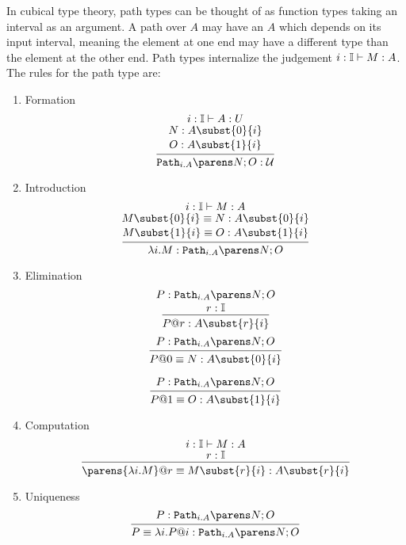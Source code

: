 \documentclass[11pt]{article}
\begin{document}
In cubical type theory, path types can be thought of as function types taking an interval as an argument. A path over $A$ may have an $A$ which depends on its input interval, meaning the element at one end may have a different type than the element at the other end. Path types internalize the judgement $\oftype{\oftype{i}{\bI}}{M}{A}$. The rules for the path type are:
\begin{enumerate}
    \item Formation
\[
    \begin{prooftree}
        \hypo{\oftype{\oftype{i}{\bI}}{A}{U}}
        \infer[no rule]1{\oftype{N}{A\subst{0}{i}}}
        \infer[no rule]1{\oftype{O}{A\subst{1}{i}}}
        \infer1{\oftype{\pathtypes{i.A}{N}{O}}{\UU}}
    \end{prooftree}
\]
    \item Introduction
\[
    \begin{prooftree}
        \hypo{\oftype{\oftype{i}{\bI}}{M}{A}}
        \infer[no rule]1{\oftype{\eqtype{M\subst{0}{i}}{N}}{A\subst{0}{i}}}
        \infer[no rule]1{\oftype{\eqtype{M\subst{1}{i}}{O}}{A\subst{1}{i}}}
        \infer1{\oftype{\lam{i}{M}}{\pathtypes{i.A}{N}{O}}}
    \end{prooftree}
\]
    \item Elimination
\[
    \begin{prooftree}
        \hypo{\oftype{P}{\pathtypes{i.A}{N}{O}}}
        \infer[no rule]1{\oftype{r}{\bI}}
        \infer1{\oftype{P@r}{A\subst{r}{i}}}
    \end{prooftree}
\]
\[
    \begin{prooftree}
        \hypo{\oftype{P}{\pathtypes{i.A}{N}{O}}}
        \infer1{\oftype{\eqtype{P@0}{N}}{A\subst{0}{i}}}
    \end{prooftree}
\]

\[
    \begin{prooftree}
        \hypo{\oftype{P}{\pathtypes{i.A}{N}{O}}}
        \infer1{\oftype{\eqtype{P@1}{O}}{A\subst{1}{i}}}
    \end{prooftree}
\]
    \item Computation
\[
    \begin{prooftree}
        \hypo{\oftype{\oftype{i}{\bI}}{M}{A}}
        \infer[no rule]1{\oftype{r}{\bI}}
        \infer1{\oftype{\eqtype{\parens{\lam{i}{M}}@r}{M\subst{r}{i}}}{A\subst{r}{i}}}
    \end{prooftree}
\]
    \item Uniqueness
\[
    \begin{prooftree}
        \hypo{\oftype{P}{\pathtypes{i.A}{N}{O}}}
        \infer1{\oftype{\eqtype{P}{\lam{i}{P}@i}}{\pathtypes{i.A}{N}{O}}}
    \end{prooftree}
\]
\end{enumerate}
\end{document}
